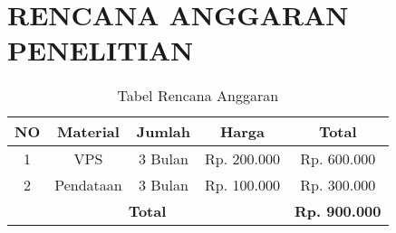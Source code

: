 \chapter*{RENCANA ANGGARAN PENELITIAN}


\begin{table}[!h]
\caption{Tabel Rencana Anggaran}
\centering
\begin{tabular}{|cccc|c|}
\hline
\multicolumn{1}{|c|}{\textbf{NO}} & \multicolumn{1}{c|}{\textbf{Material}} & \multicolumn{1}{c|}{\textbf{Jumlah}} & \textbf{Harga} & \textbf{Total} \\ \hline
\multicolumn{1}{|c|}{1}           & \multicolumn{1}{c|}{VPS}    & \multicolumn{1}{c|}{3 Bulan}         & Rp. 200.000    & Rp. 600.000    \\ \hline
\multicolumn{1}{|c|}{2}           & \multicolumn{1}{c|}{Pendataan}         & \multicolumn{1}{c|}{3 Bulan}         & Rp. 100.000    & Rp. 300.000    \\ \hline
\multicolumn{4}{|c|}{\textbf{Total}}                                                                                               & {\textbf{Rp. 900.000}}    \\ \hline
\end{tabular}
\end{table}